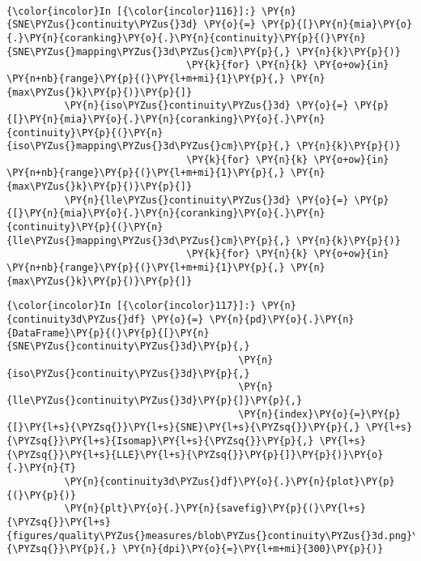     \begin{center}
    \end{center}
    { \hspace*{\fill} \\}

    \begin{Verbatim}[commandchars=\\\{\}]
{\color{incolor}In [{\color{incolor}116}]:} \PY{n}{SNE\PYZus{}continuity\PYZus{}3d} \PY{o}{=} \PY{p}{[}\PY{n}{mia}\PY{o}{.}\PY{n}{coranking}\PY{o}{.}\PY{n}{continuity}\PY{p}{(}\PY{n}{SNE\PYZus{}mapping\PYZus{}3d\PYZus{}cm}\PY{p}{,} \PY{n}{k}\PY{p}{)}
                               \PY{k}{for} \PY{n}{k} \PY{o+ow}{in} \PY{n+nb}{range}\PY{p}{(}\PY{l+m+mi}{1}\PY{p}{,} \PY{n}{max\PYZus{}k}\PY{p}{)}\PY{p}{]}
          \PY{n}{iso\PYZus{}continuity\PYZus{}3d} \PY{o}{=} \PY{p}{[}\PY{n}{mia}\PY{o}{.}\PY{n}{coranking}\PY{o}{.}\PY{n}{continuity}\PY{p}{(}\PY{n}{iso\PYZus{}mapping\PYZus{}3d\PYZus{}cm}\PY{p}{,} \PY{n}{k}\PY{p}{)}
                               \PY{k}{for} \PY{n}{k} \PY{o+ow}{in} \PY{n+nb}{range}\PY{p}{(}\PY{l+m+mi}{1}\PY{p}{,} \PY{n}{max\PYZus{}k}\PY{p}{)}\PY{p}{]}
          \PY{n}{lle\PYZus{}continuity\PYZus{}3d} \PY{o}{=} \PY{p}{[}\PY{n}{mia}\PY{o}{.}\PY{n}{coranking}\PY{o}{.}\PY{n}{continuity}\PY{p}{(}\PY{n}{lle\PYZus{}mapping\PYZus{}3d\PYZus{}cm}\PY{p}{,} \PY{n}{k}\PY{p}{)}
                               \PY{k}{for} \PY{n}{k} \PY{o+ow}{in} \PY{n+nb}{range}\PY{p}{(}\PY{l+m+mi}{1}\PY{p}{,} \PY{n}{max\PYZus{}k}\PY{p}{)}\PY{p}{]}
\end{Verbatim}

    \begin{Verbatim}[commandchars=\\\{\}]
{\color{incolor}In [{\color{incolor}117}]:} \PY{n}{continuity3d\PYZus{}df} \PY{o}{=} \PY{n}{pd}\PY{o}{.}\PY{n}{DataFrame}\PY{p}{(}\PY{p}{[}\PY{n}{SNE\PYZus{}continuity\PYZus{}3d}\PY{p}{,}
                                        \PY{n}{iso\PYZus{}continuity\PYZus{}3d}\PY{p}{,}
                                        \PY{n}{lle\PYZus{}continuity\PYZus{}3d}\PY{p}{]}\PY{p}{,}
                                        \PY{n}{index}\PY{o}{=}\PY{p}{[}\PY{l+s}{\PYZsq{}}\PY{l+s}{SNE}\PY{l+s}{\PYZsq{}}\PY{p}{,} \PY{l+s}{\PYZsq{}}\PY{l+s}{Isomap}\PY{l+s}{\PYZsq{}}\PY{p}{,} \PY{l+s}{\PYZsq{}}\PY{l+s}{LLE}\PY{l+s}{\PYZsq{}}\PY{p}{]}\PY{p}{)}\PY{o}{.}\PY{n}{T}
          \PY{n}{continuity3d\PYZus{}df}\PY{o}{.}\PY{n}{plot}\PY{p}{(}\PY{p}{)}
          \PY{n}{plt}\PY{o}{.}\PY{n}{savefig}\PY{p}{(}\PY{l+s}{\PYZsq{}}\PY{l+s}{figures/quality\PYZus{}measures/blob\PYZus{}continuity\PYZus{}3d.png}\PY{l+s}{\PYZsq{}}\PY{p}{,} \PY{n}{dpi}\PY{o}{=}\PY{l+m+mi}{300}\PY{p}{)}
\end{Verbatim}

